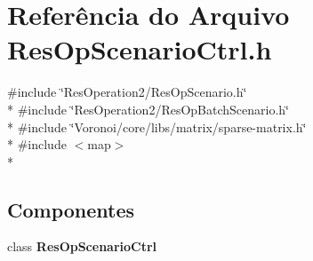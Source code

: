 \section{Referência do Arquivo Res\+Op\+Scenario\+Ctrl.\+h}
\label{_res_op_scenario_ctrl_8h}
{\ttfamily \#include \char`\"{}Res\+Operation2/\+Res\+Op\+Scenario.\+h\char`\"{}}\\*
{\ttfamily \#include \char`\"{}Res\+Operation2/\+Res\+Op\+Batch\+Scenario.\+h\char`\"{}}\\*
{\ttfamily \#include \char`\"{}Voronoi/core/libs/matrix/sparse-\/matrix.\+h\char`\"{}}\\*
{\ttfamily \#include $<$map$>$}\\*
\subsection*{Componentes}
\begin{DoxyCompactItemize}
\item 
class {\bf Res\+Op\+Scenario\+Ctrl}
\end{DoxyCompactItemize}
